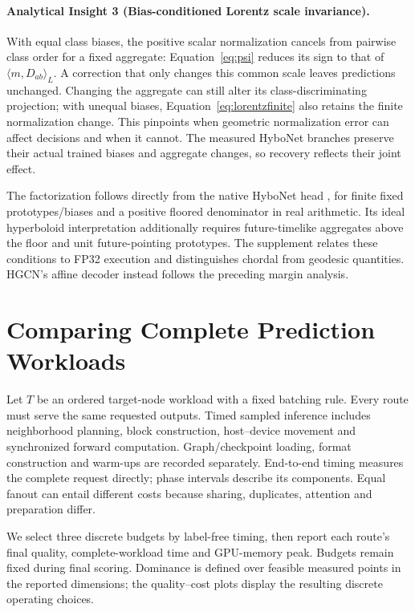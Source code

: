 \documentclass[sigconf, nonacm]{acmart}
\newcommand{\ip}[2]{\langle #1,#2\rangle_L}
\begin{document}
\paragraph{\normalfont\bfseries Analytical Insight 3 (Bias-conditioned Lorentz scale invariance).}
With equal class biases, the positive scalar normalization cancels from pairwise class order for a fixed aggregate: Equation~\eqref{eq:psi} reduces its sign to that of $\ip{m}{D_{ab}}$. A correction that only changes this common scale leaves predictions unchanged. Changing the aggregate can still alter its class-discriminating projection; with unequal biases, Equation~\eqref{eq:lorentzfinite} also retains the finite normalization change. This pinpoints when geometric normalization error can affect decisions and when it cannot. The measured HyboNet branches preserve their actual trained biases and aggregate changes, so recovery reflects their joint effect.

The factorization follows directly from the native HyboNet head \cite{chen2022fully}, for finite fixed prototypes/biases and a positive floored denominator in real arithmetic. Its ideal hyperboloid interpretation additionally requires future-timelike aggregates above the floor and unit future-pointing prototypes. The supplement relates these conditions to FP32 execution and distinguishes chordal from geodesic quantities. HGCN's affine decoder instead follows the preceding margin analysis.

\section{Comparing Complete Prediction Workloads}
\label{sec:cost}
Let $T$ be an ordered target-node workload with a fixed batching rule. Every route must serve the same requested outputs. Timed sampled inference includes neighborhood planning, block construction, host--device movement and synchronized forward computation. Graph/checkpoint loading, format construction and warm-ups are recorded separately. End-to-end timing measures the complete request directly; phase intervals describe its components. Equal fanout can entail different costs because sharing, duplicates, attention and preparation differ.

We select three discrete budgets by label-free timing, then report each route's final quality, complete-workload time and GPU-memory peak. Budgets remain fixed during final scoring. Dominance is defined over feasible measured points in the reported dimensions; the quality--cost plots display the resulting discrete operating choices.
\end{document}

